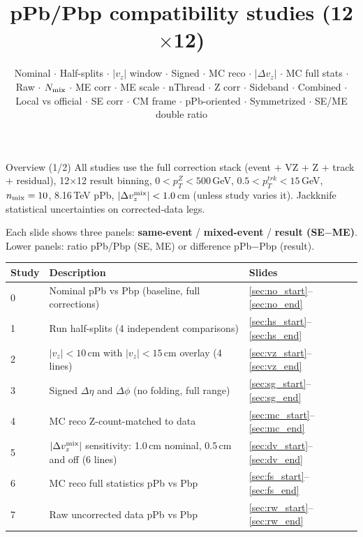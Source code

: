 \documentclass[aspectratio=169]{beamer}
\title{pPb/Pbp compatibility studies (12$\times$12)}
\subtitle{Nominal $\cdot$ Half-splits $\cdot$ $|v_z|$ window $\cdot$ Signed $\cdot$ MC reco $\cdot$ $|\Delta v_z|$ $\cdot$ MC full stats $\cdot$ Raw $\cdot$ $N_{\rm mix}$ $\cdot$ ME corr $\cdot$ ME scale $\cdot$ nThread $\cdot$ Z corr $\cdot$ Sideband $\cdot$ Combined $\cdot$ Local vs official $\cdot$ SE corr $\cdot$ CM frame $\cdot$ pPb-oriented $\cdot$ Symmetrized $\cdot$ SE/ME double ratio}
\date{}
\begin{document}
\begin{frame}
  \titlepage
\end{frame}

\begin{frame}[t]{Overview (1/2)}
  \small
  All studies use the full correction stack (event $+$ VZ $+$ Z $+$ track $+$ residual),
  12$\times$12 result binning, $0<p_T^Z<500$\,GeV, $0.5<p_T^{trk}<15$\,GeV,
  $n_{\rm mix}=10$, 8.16\,TeV pPb, $|\Delta v_z^{\rm mix}|<1.0$\,cm (unless study varies it).
  Jackknife statistical uncertainties on corrected-data legs.\par
  \vspace{0.4em}
  Each slide shows three panels: \textbf{same-event} / \textbf{mixed-event} / \textbf{result (SE$-$ME)}.
  Lower panels: ratio pPb/Pbp (SE, ME) or difference pPb$-$Pbp (result).\par
  \vspace{0.5em}
  \begin{tabular}{lll}
    \hline
    Study & Description & Slides \\
    \hline
    0 & Nominal pPb vs Pbp (baseline, full corrections) & \ref{sec:no_start}--\ref{sec:no_end} \\
    1 & Run half-splits (4 independent comparisons) & \ref{sec:hs_start}--\ref{sec:hs_end} \\
    2 & $|v_z|<10$\,cm with $|v_z|<15$\,cm overlay (4 lines) & \ref{sec:vz_start}--\ref{sec:vz_end} \\
    3 & Signed $\Delta\eta$ and $\Delta\phi$ (no folding, full range) & \ref{sec:sg_start}--\ref{sec:sg_end} \\
    4 & MC reco Z-count-matched to data & \ref{sec:mc_start}--\ref{sec:mc_end} \\
    5 & $|\Delta v_z^{\rm mix}|$ sensitivity: 1.0\,cm nominal, 0.5\,cm and off (6 lines) & \ref{sec:dv_start}--\ref{sec:dv_end} \\
    6 & MC reco full statistics pPb vs Pbp & \ref{sec:fs_start}--\ref{sec:fs_end} \\
    7 & Raw uncorrected data pPb vs Pbp & \ref{sec:rw_start}--\ref{sec:rw_end} \\
    \hline
  \end{tabular}
\end{frame}
\end{document}

